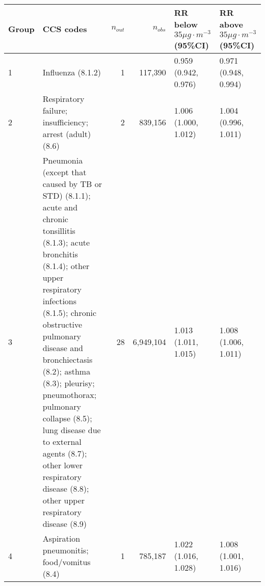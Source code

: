 \begin{tabular}{lp{6.5cm}rrp{2.2cm}p{2.2cm}}
  \hline
Group & CCS codes & $n_{out}$ & $n_{obs}$ & RR below $35 \mu g \cdot m^{-3}$ (95\%CI) & RR above $35 \mu g \cdot m^{-3}$ (95\%CI) \\ 
  \hline
   1 & Influenza (8.1.2) &    1 & 117,390 & 0.959 (0.942, 0.976) & 0.971 (0.948, 0.994) \\ 
     2 & Respiratory failure; insufficiency; arrest (adult) (8.6) &    2 & 839,156 & 1.006 (1.000, 1.012) & 1.004 (0.996, 1.011) \\ 
     3 & Pneumonia (except that caused by TB or STD) (8.1.1); acute and chronic tonsillitis (8.1.3); acute bronchitis (8.1.4); other upper respiratory infections (8.1.5); chronic obstructive pulmonary disease and bronchiectasis (8.2); asthma (8.3); pleurisy; pneumothorax; pulmonary collapse (8.5); lung disease due to external agents (8.7); other lower respiratory disease (8.8); other upper respiratory disease (8.9) &   28 & 6,949,104 & 1.013 (1.011, 1.015) & 1.008 (1.006, 1.011) \\ 
     4 & Aspiration pneumonitis; food/vomitus (8.4) &    1 & 785,187 & 1.022 (1.016, 1.028) & 1.008 (1.001, 1.016) \\ 
   \hline
\end{tabular}

